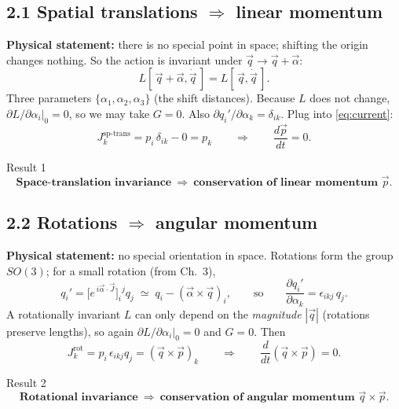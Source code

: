 \documentclass[11pt]{article}
\newcommand{\dd}[2]{\frac{\partial #1}{\partial #2}}
\newcommand{\ddt}[1]{\frac{d#1}{dt}}
\begin{document}
\subsection*{2.1 Spatial translations $\Rightarrow$ linear momentum}

\textbf{Physical statement:} there is no special point in space; shifting the
origin changes nothing. So the action is invariant under $\vec q\to\vec q+\vec\alpha$:
\begin{equation}
L[\,\vec q+\vec\alpha,\dot{\vec q}\,]=L[\,\vec q,\dot{\vec q}\,].
\end{equation}
Three parameters $\{\alpha_1,\alpha_2,\alpha_3\}$ (the shift distances). Because
$L$ does not change, $\partial L/\partial\alpha_i|_0=0$, so we may take $G=0$.
Also $\partial q_i'/\partial\alpha_k=\delta_{ik}$. Plug into \eqref{eq:current}:
\begin{equation}
J_k^{\text{sp-trans}} = p_i\,\delta_{ik}-0 = p_k
\qquad\Longrightarrow\qquad \ddt{\vec p}=0 .
\end{equation}

\begin{keybox}{Result 1}
\[
\textbf{Space-translation invariance}\ \Longrightarrow\ \textbf{conservation of linear momentum }\vec p .
\]
\end{keybox}

\subsection*{2.2 Rotations $\Rightarrow$ angular momentum}

\textbf{Physical statement:} no special orientation in space. Rotations form the
group $SO(3)$; for a small rotation (from Ch.~3),
\begin{equation}
q_i' = \big[e^{\,i\vec\alpha\cdot\vec J}\big]_i{}^{j} q_j
\;\simeq\; q_i-(\vec\alpha\times\vec q)_i ,
\qquad\text{so}\qquad
\dd{q_i'}{\alpha_k}=\epsilon_{ikj}\,q_j .
\end{equation}
A rotationally invariant $L$ can only depend on the \emph{magnitude} $|\vec q|$
(rotations preserve lengths), so again $\partial L/\partial\alpha_i|_0=0$ and
$G=0$. Then
\begin{equation}
J_k^{\text{rot}} = p_i\,\epsilon_{ikj}q_j = (\vec q\times\vec p)_k
\qquad\Longrightarrow\qquad \ddt{}(\vec q\times\vec p)=0 .
\end{equation}

\begin{keybox}{Result 2}
\[
\textbf{Rotational invariance}\ \Longrightarrow\ \textbf{conservation of angular momentum }\vec q\times\vec p .
\]
\end{keybox}
\end{document}
